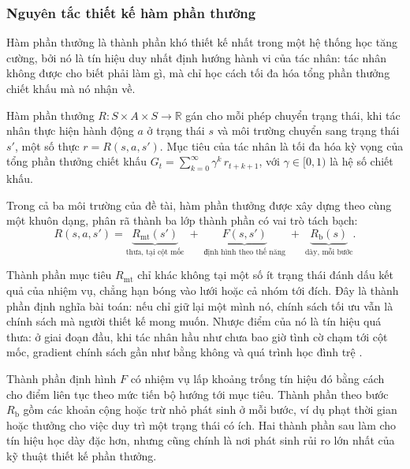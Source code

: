 \subsubsection{Nguyên tắc thiết kế hàm phần thưởng}
\label{sub:reward-principle}
\indent Hàm phần thưởng là thành phần khó thiết kế nhất trong một hệ thống học tăng
cường, bởi nó là tín hiệu duy nhất định hướng hành vi của tác nhân: tác nhân
không được cho biết phải làm gì, mà chỉ học cách tối đa hóa tổng phần thưởng chiết khấu
mà nó nhận về.

\begin{dn}
\label{dn:reward}
Hàm phần thưởng $R: S \times A \times S \to \mathbb{R}$ gán cho mỗi phép chuyển trạng
thái, khi tác nhân thực hiện hành động $a$ ở trạng thái $s$ và môi trường chuyển sang
trạng thái $s'$, một số thực $r = R(s, a, s')$. Mục tiêu của tác nhân là tối đa hóa kỳ
vọng của tổng phần thưởng chiết khấu $G_t = \sum_{k=0}^{\infty} \gamma^{k}\, r_{t+k+1}$,
với $\gamma \in [0,1)$ là hệ số chiết khấu.
\end{dn}

\indent Trong cả ba môi trường của đề tài, hàm phần thưởng được xây dựng theo cùng một
khuôn dạng, phân rã thành ba lớp thành phần có vai trò tách bạch:
\begin{equation}
R(s, a, s') = \underbrace{R_{\mathrm{mt}}(s')}_{\text{thưa, tại cột mốc}}
            \;+\; \underbrace{F(s, s')}_{\text{định hình theo thế năng}}
            \;+\; \underbrace{R_{\mathrm{b}}(s)}_{\text{dày, mỗi bước}} .
\label{eq:reward-decomp}
\end{equation}

\indent Thành phần mục tiêu $R_{\mathrm{mt}}$ chỉ khác không tại một số ít trạng
thái đánh dấu kết quả của nhiệm vụ, chẳng hạn bóng vào lưới hoặc cả nhóm tới đích. Đây
là thành phần định nghĩa bài toán: nếu chỉ giữ lại một mình nó, chính sách tối ưu
vẫn là chính sách mà người thiết kế mong muốn. Nhược điểm của nó là tín hiệu quá thưa:
ở giai đoạn đầu, khi tác nhân hầu như chưa bao giờ tình cờ chạm tới cột mốc, gradient
chính sách gần như bằng không và quá trình học đình trệ \cite{sutton2018reinforcement}.

\indent Thành phần định hình $F$ có nhiệm vụ lấp khoảng trống tín hiệu đó bằng
cách cho điểm liên tục theo mức tiến bộ hướng tới mục tiêu. Thành phần theo bước
$R_{\mathrm{b}}$ gồm các khoản cộng hoặc trừ nhỏ phát sinh ở mỗi bước, ví dụ phạt thời
gian hoặc thưởng cho việc duy trì một trạng thái có ích. Hai thành phần sau làm cho tín
hiệu học dày đặc hơn, nhưng cũng chính là nơi phát sinh rủi ro lớn nhất của kỹ thuật
thiết kế phần thưởng.


